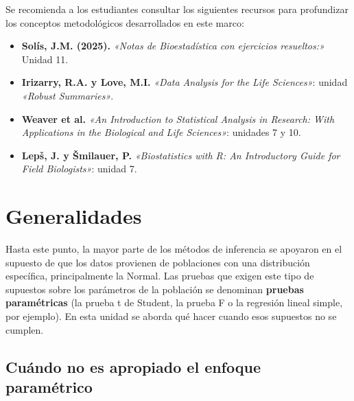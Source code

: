 \documentclass[
  spanish,
  letterpaper,
  DIV=11,
  numbers=noendperiod]{scrreprt}
\providecommand{\tightlist}{%
  \setlength{\itemsep}{0pt}\setlength{\parskip}{0pt}}
\begin{document}
\begin{tcolorbox}[enhanced jigsaw, arc=.35mm, bottomrule=.15mm, bottomtitle=1mm, breakable, colback=white, colbacktitle=quarto-callout-important-color!10!white, colframe=quarto-callout-important-color-frame, coltitle=black, left=2mm, leftrule=.75mm, opacityback=0, opacitybacktitle=0.6, rightrule=.15mm, title=\textcolor{quarto-callout-important-color}{\faExclamation}\hspace{0.5em}{Lectura Sugerida para el Trabajo Práctico}, titlerule=0mm, toprule=.15mm, toptitle=1mm]

Se recomienda a los estudiantes consultar los siguientes recursos para
profundizar los conceptos metodológicos desarrollados en este marco:

\begin{itemize}
\tightlist
\item
  \textbf{Solís, J.M. (2025).} \emph{«Notas de Bioestadística con
  ejercicios resueltos:»} Unidad 11.
\item
  \textbf{Irizarry, R.A. y Love, M.I.} \emph{«Data Analysis for the Life
  Sciences»}: unidad \emph{«Robust Summaries»}.
\item
  \textbf{Weaver et al.} \emph{«An Introduction to Statistical Analysis
  in Research: With Applications in the Biological and Life Sciences»}:
  unidades 7 y 10.
\item
  \textbf{Lepš, J. y Šmilauer, P.} \emph{«Biostatistics with R: An
  Introductory Guide for Field Biologists»}: unidad 7.
\end{itemize}

\end{tcolorbox}

\section{Generalidades}\label{generalidades-7}

Hasta este punto, la mayor parte de los métodos de inferencia se
apoyaron en el supuesto de que los datos provienen de poblaciones con
una distribución específica, principalmente la Normal. Las pruebas que
exigen este tipo de supuestos sobre los parámetros de la población se
denominan \textbf{pruebas paramétricas} (la prueba t de Student, la
prueba F o la regresión lineal simple, por ejemplo). En esta unidad se
aborda qué hacer cuando esos supuestos no se cumplen.

\subsection{Cuándo no es apropiado el enfoque
paramétrico}\label{cuuxe1ndo-no-es-apropiado-el-enfoque-paramuxe9trico}
\end{document}
